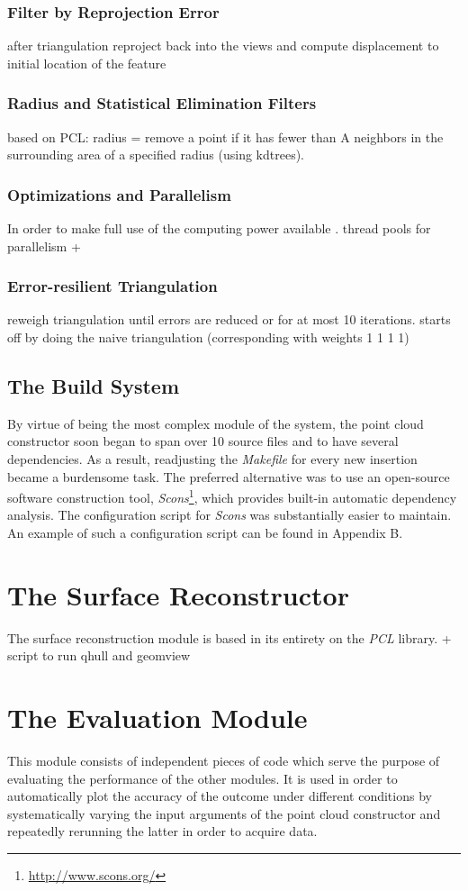 \documentclass[12pt,a4paper,twoside,openright]{report}
\begin{document}
\subsubsection{Filter by Reprojection Error}
after triangulation reproject back into the views and compute displacement to initial location of the feature

\subsubsection{Radius and Statistical Elimination Filters}
based on PCL: radius = remove a point if it has fewer than A neighbors in the surrounding area of a specified radius (using kdtrees).
\subsubsection{Optimizations and Parallelism}
In order to make full use of the computing power available .
thread pools for parallelism + 
\subsubsection{Error-resilient Triangulation}
reweigh triangulation until errors are reduced or for at most 10 iterations.
starts off by doing the naive triangulation (corresponding with weights 1 1 1 1)

\subsection{The Build System}
By virtue of being the most complex module of the system, the point cloud constructor soon began to span over 10 source files and to have several dependencies. As a result, readjusting the \emph{Makefile} for every new insertion became a burdensome task. The preferred alternative was to use an open-source software construction tool, \emph{Scons}\footnote{\url{http://www.scons.org/}}, which provides built-in automatic dependency analysis. The configuration script for \emph{Scons} was substantially easier to maintain. An example of such a configuration script can be found in Appendix B.

\section{The Surface Reconstructor}
The surface reconstruction module is based in its entirety on the \emph{PCL} library.  + script to run qhull and geomview

\section{The Evaluation Module}
This module consists of independent pieces of code which serve the purpose of evaluating the performance of the other modules. It is used in order to automatically plot the accuracy of the outcome under different conditions by systematically varying the input arguments of the point cloud constructor and repeatedly rerunning the latter in order to acquire data. 
\end{document}
